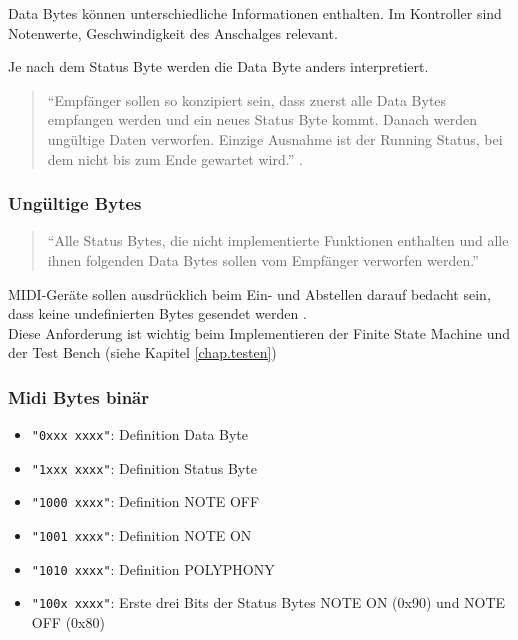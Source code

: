 Data Bytes können unterschiedliche Informationen enthalten. Im Kontroller sind Notenwerte, Geschwindigkeit des Anschalges relevant.

Je nach dem Status Byte werden die Data Byte anders interpretiert. 

\begin{quote}
``Empfänger sollen so konzipiert sein, dass zuerst alle Data Bytes empfangen werden und ein neues Status Byte kommt. Danach werden ungültige Daten verworfen. Einzige Ausnahme ist der Running Status, bei dem nicht bis zum Ende gewartet wird.'' \citep{Midi_specification}.
\end{quote}

\subsubsection*{Ungültige Bytes}

\begin{quote}
``Alle Status Bytes, die nicht implementierte Funktionen enthalten und alle ihnen folgenden Data Bytes sollen vom Empfänger verworfen werden.'' \citep{Midi_specification}
\end{quote}

MIDI-Geräte sollen ausdrücklich beim Ein- und Abstellen darauf bedacht sein, dass keine undefinierten Bytes gesendet werden \citep{Midi_specification}.\\
Diese Anforderung ist wichtig beim Implementieren der Finite State Machine und der Test Bench (siehe Kapitel \ref{chap.testen})

\subsubsection*{Midi Bytes binär}\label{midi_binaer}

\begin{itemize}
	\item \lstinline|"0xxx xxxx"|: Definition Data Byte
	\item \lstinline|"1xxx xxxx"|: Definition Status Byte
	\item \lstinline|"1000 xxxx"|: Definition NOTE OFF
	\item \lstinline|"1001 xxxx"|: Definition NOTE ON
	\item \lstinline|"1010 xxxx"|: Definition POLYPHONY
	\item \lstinline|"100x xxxx"|: Erste drei Bits der Status Bytes NOTE ON (0x90) und NOTE OFF (0x80)
\end{itemize}

